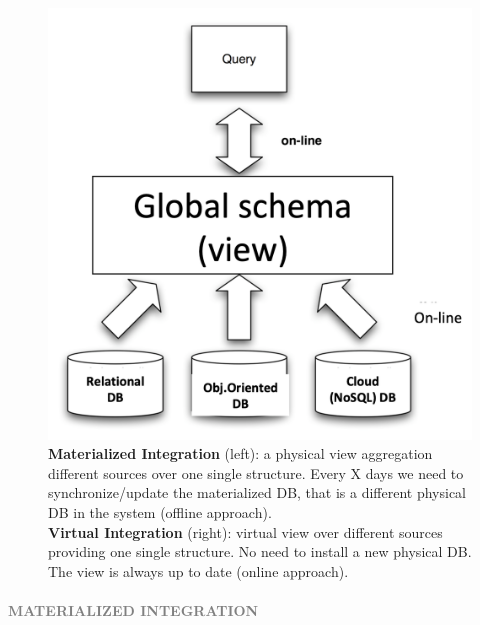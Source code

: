 \documentclass[10pt,a4paper]{article}
\newcommand{\myparagraph}[1]{\paragraph{\normalsize{\textcolor{gray}{\uppercase{\textbf{#1}}}} }\mbox{} \vspace{0.5em}\\}
\begin{document}
\begin{justify}
\begin{figure}[htp]
\includegraphics[width=.4\textwidth]{images/virtual-integration}\hfill
\begin{tiny}
\caption{\textbf{Materialized Integration} (left): a physical view aggregation different sources over one single structure. Every X days we need to synchronize/update the materialized DB, that is a different physical DB in the system (offline approach). \\
\textbf{Virtual Integration} (right): virtual view over different sources providing one single structure. No need to install a new physical DB. The view is always up to date (online approach).}
\end{tiny}
\end{figure}
\raggedright
\end{justify}
\myparagraph{Materialized Integration}
\end{document}
